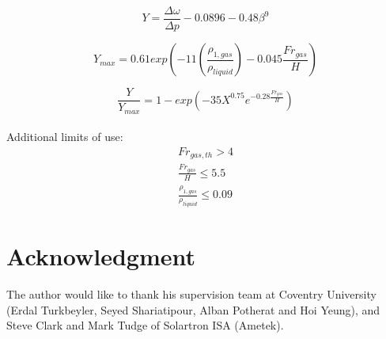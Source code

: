 \documentclass[journal]{IEEEtran}
\begin{document}
\begin{equation}
\label{eq:11583_Y}
    Y = \frac{\Delta \omega}{\Delta p} - 0.0896 -0.48 \beta^{9}
\end{equation}

\begin{equation}
    Y_{max} = 0.61 exp \left( -11 \left( \frac{\rho_{1,gas}}{\rho_{liquid}} \right) - 0.045 \frac{Fr_{gas}}{H} \right)
\end{equation}

\begin{equation}
    \frac{Y}{Y_{max}} = 1 - exp \left(-35 X^{0.75} e^{-0.28 \frac{Fr_{gas}}{H}} \right)
\end{equation}
\\
Additional limits of use: \\
\begin{equation*}
\begin{aligned}
    Fr_{gas,th} > 4 \\
    \frac{Fr_{gas}}{H} \leq 5.5 \\
    \frac{\rho_{1,gas}}{\rho_{liquid}} \leq 0.09
\end{aligned}
\end{equation*}

\section*{Acknowledgment}
The author would like to thank his supervision team at Coventry University (Erdal Turkbeyler, Seyed Shariatipour, Alban Potherat and Hoi Yeung), and Steve Clark and Mark Tudge of Solartron ISA (Ametek). 


\ifCLASSOPTIONcaptionsoff
  \newpage
\fi







%
%
%
\end{document}
